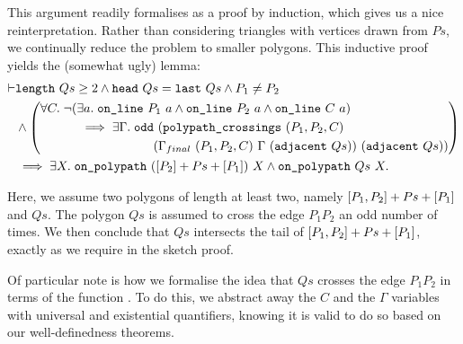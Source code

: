 This argument readily formalises as a proof by induction, which gives us a nice reinterpretation. Rather than considering triangles with vertices drawn from $Ps$, we continually reduce the problem to smaller polygons. This inductive proof yields the (somewhat ugly) lemma:
\begin{equation}\label{eq:oddCrossClosedPolypath}
  \begin{aligned}
    \vdash&\texttt{length}\ Qs \geq 2 \wedge \texttt{head}\ Qs = \texttt{last}\ Qs\wedge P_1\neq P_2\\
    &\wedge \left(\begin{aligned}&\forall C.\; \neg(\exists a.\; \texttt{on\_line}\ P_1\ a\wedge \texttt{on\_line}\ P_2\ a\wedge \texttt{on\_line}\ C\ a)\\
    &\qquad\quad \implies \exists \Gamma.\; \texttt{odd}\ (\texttt{polypath\_crossings}\ (P_1,P_2,C)\\
    &\qquad\quad\qquad\qquad\qquad(\Gamma_{final}\ (P_1,P_2,C)\ \Gamma\ (\texttt{adjacent}\ Qs))\ (\texttt{adjacent}\ Qs))\end{aligned}\right)\\
    &\implies\exists X.\; \texttt{on\_polypath}\ ([P_2] + Ps + [P_1])\ X \wedge \texttt{on\_polypath}\ Qs\ X.
  \end{aligned}
\end{equation}

Here, we assume two polygons of length at least two, namely $[P_1,P_2] + Ps + [P_1]$ and $Qs$. The polygon $Qs$ is assumed to cross the edge $P_1P_2$ an odd number of times. We then conclude that $Qs$ intersects the tail of $[P_1,P_2] + Ps + [P_1]$, exactly as we require in the sketch proof.

Of particular note is how we formalise the idea that $Qs$ crosses the edge $P_1P_2$ in terms of the function . To do this, we abstract away the $C$ and the $\Gamma$ variables with universal and existential quantifiers, knowing it is valid to do so based on our well-definedness theorems.

